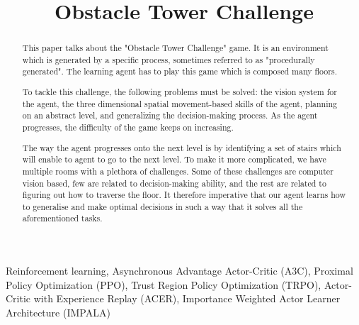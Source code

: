 \documentclass[conference]{IEEEtran}
\begin{document}
\title{Obstacle Tower Challenge}

\author{
\and
{}
\and
{}
\and
{}
}

\maketitle

\begin{abstract}
This paper talks about the "Obstacle Tower Challenge" game. It is an environment which is generated by a specific process, sometimes referred to as "procedurally generated". The learning agent has to play this game which is composed many floors.

To tackle this challenge, the following problems must be solved: the vision system for the agent, the three dimensional spatial movement-based skills of the agent, planning on an abstract level, and generalizing the decision-making process. As the agent progresses, the difficulty of the game keeps on increasing.

The way the agent progresses onto the next level is by identifying a set of stairs which will enable to agent to go to the next level. To make it more complicated, we have multiple rooms with a plethora of challenges. Some of these challenges are computer vision based, few are related to decision-making ability, and the rest are related to figuring out how to traverse the floor. It therefore imperative that our agent learns how to generalise and make optimal decisions in such a way that it solves all the aforementioned tasks.
\end{abstract}

\begin{IEEEkeywords}
Reinforcement learning, Asynchronous Advantage Actor-Critic (A3C), Proximal Policy Optimization (PPO), Trust Region Policy Optimization (TRPO), Actor-Critic with Experience Replay (ACER), Importance Weighted Actor Learner Architecture (IMPALA)
\end{IEEEkeywords}
\end{document}

